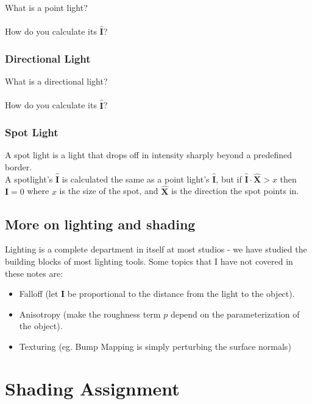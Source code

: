 \documentclass[]{article}
\begin{document}
What is a point light? 
\textwidth{\hrulefill} 
\\
\\
How do you calculate its $\hat{\mathbf{I}}$?
\textwidth{\hrulefill}

\subsubsection{Directional Light}

What is a directional light? 
\textwidth{\hrulefill} 
\\
\\
How do you calculate its $\hat{\mathbf{I}}$?
\textwidth{\hrulefill}

\subsubsection{Spot Light}

A spot light is a light that drops off in intensity sharply beyond a predefined border. \\
A spotlight's $\hat{\mathbf{I}}$ is calculated the same as a point light's $\hat{\mathbf{I}}$, but if $\hat{\mathbf{I}} \cdot \hat{\mathbf{X}} > x$ then $\mathbf{I} = 0$ where $x$ is the size of the spot, and $\hat{\mathbf{X}}$ is the direction the spot points in.

\subsection{More on lighting and shading}

Lighting is a complete department in itself at most studios - we have studied the building blocks of most lighting tools. Some topics that I have not covered in these notes are:

\begin{itemize}
    \item Falloff (let $\mathbf{I}$ be proportional to the distance from the light to the object).
    \item Anisotropy (make the roughness term $p$ depend on the parameterization of the object).
    \item Texturing (eg. Bump Mapping is simply perturbing the surface normals)
\end{itemize}

\pagebreak

\section{Shading Assignment}
\end{document}

